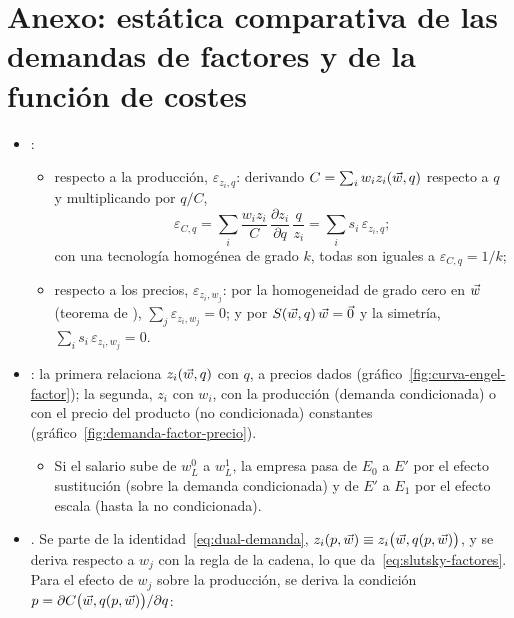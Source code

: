 \documentclass[11pt]{article}
\begin{document}
\section{Anexo: estática comparativa de las demandas de factores\cortetitulo{} y de la función de costes}\label{anexo:estatica}

\begin{itemize}
\item {}:
  \begin{itemize}
  \item respecto a la producción, $\varepsilon_{z_i,q}$: derivando $C=\sum_iw_iz_i(\vec{w},q)$ respecto a $q$ y multiplicando por $q/C$,
    \begin{equation*}
    \varepsilon_{C,q}=\sum_i\frac{w_iz_i}{C}\,\frac{\partial z_i}{\partial q}\,\frac{q}{z_i}=\sum_is_i\,\varepsilon_{z_i,q};
    \end{equation*}
    con una tecnología homogénea de grado $k$, todas son iguales a $\varepsilon_{C,q}=1/k$;
  \item respecto a los precios, $\varepsilon_{z_i,w_j}$: por la homogeneidad de grado cero en $\vec{w}$ (teorema de ), $\sum_j\varepsilon_{z_i,w_j}=0$; y por $S(\vec{w},q)\,\vec{w}=\vec{0}$ y la simetría, $\sum_is_i\,\varepsilon_{z_i,w_j}=0$.
  \end{itemize}
\item {}: la primera relaciona $z_i(\vec{w},q)$ con $q$, a precios dados (gráfico~\ref{fig:curva-engel-factor}); la segunda, $z_i$ con $w_i$, con la producción (demanda condicionada) o con el precio del producto (no condicionada) constantes (gráfico~\ref{fig:demanda-factor-precio}).
  \begin{itemize}
  \item Si el salario sube de $w_L^0$ a $w_L^1$, la empresa pasa de $E_0$ a $E'$ por el efecto sustitución (sobre la demanda condicionada) y de $E'$ a $E_1$ por el efecto escala (hasta la no condicionada).
  \end{itemize}
\item {}. Se parte de la identidad~\eqref{eq:dual-demanda}, $z_i(p,\vec{w})\equiv z_i\big(\vec{w},q(p,\vec{w})\big)$, y se deriva respecto a $w_j$ con la regla de la cadena, lo que da~\eqref{eq:slutsky-factores}. Para el efecto de $w_j$ sobre la producción, se deriva la condición $p=\partial C\big(\vec{w},q(p,\vec{w})\big)/\partial q$:

\end{itemize}
\end{document}
